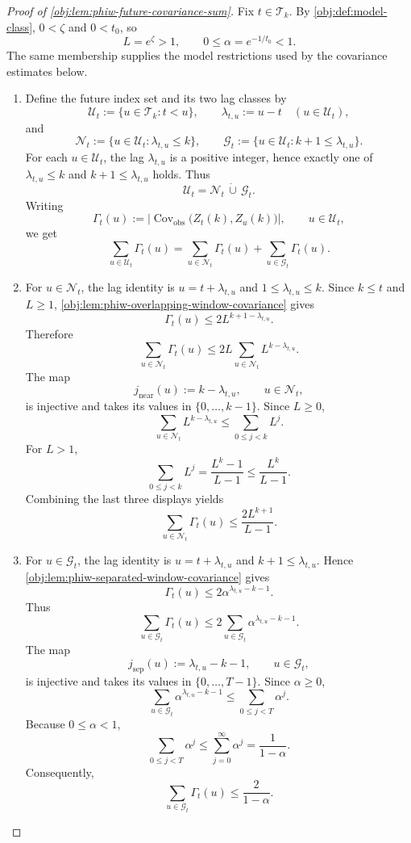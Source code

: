 \begin{proof}[Proof of \cref{obj:lem:phiw-future-covariance-sum}]
Fix \(t\in\mathscr T_k\). By \cref{obj:def:model-class}, \(0<\zeta\) and \(0<t_0\), so
\[
L=e^\zeta>1,
\qquad
0\le \alpha=e^{-1/t_0}<1 .
\]
The same membership supplies the model restrictions used by the covariance estimates below.

\begin{enumerate}
\item Define the future index set and its two lag classes by
\[
\mathscr U_t:=\{u\in\mathscr T_k:t<u\},
\qquad
\lambda_{t,u}:=u-t\quad (u\in\mathscr U_t),
\]
and
\[
\mathscr N_t:=\{u\in\mathscr U_t:\lambda_{t,u}\le k\},
\qquad
\mathscr G_t:=\{u\in\mathscr U_t:k+1\le \lambda_{t,u}\}.
\]
For each \(u\in\mathscr U_t\), the lag \(\lambda_{t,u}\) is a positive integer, hence exactly one of
\(\lambda_{t,u}\le k\) and \(k+1\le\lambda_{t,u}\) holds. Thus
\[
\mathscr U_t=\mathscr N_t\,\dot\cup\,\mathscr G_t .
\]
Writing
\[
\Gamma_t(u):=
\bigl|\operatorname{Cov}_{\mathrm{obs}}\bigl(Z_t(k),Z_u(k)\bigr)\bigr|,
\qquad u\in\mathscr U_t,
\]
we get
\[
\sum_{u\in\mathscr U_t}\Gamma_t(u)
=
\sum_{u\in\mathscr N_t}\Gamma_t(u)
+
\sum_{u\in\mathscr G_t}\Gamma_t(u).
\]

\item For \(u\in\mathscr N_t\), the lag identity is \(u=t+\lambda_{t,u}\) and
\(1\le\lambda_{t,u}\le k\). Since \(k\le t\) and \(L\ge1\), \cref{obj:lem:phiw-overlapping-window-covariance} gives
\[
\Gamma_t(u)\le 2L^{k+1-\lambda_{t,u}}.
\]
Therefore
\[
\sum_{u\in\mathscr N_t}\Gamma_t(u)
\le
2L\sum_{u\in\mathscr N_t}L^{k-\lambda_{t,u}}.
\]
The map
\[
j_{\mathrm{near}}(u):=k-\lambda_{t,u},
\qquad u\in\mathscr N_t,
\]
is injective and takes its values in \(\{0,\ldots,k-1\}\). Since \(L\ge0\),
\[
\sum_{u\in\mathscr N_t}L^{k-\lambda_{t,u}}
\le
\sum_{0\le j<k}L^j .
\]
For \(L>1\),
\[
\sum_{0\le j<k}L^j
=
\frac{L^k-1}{L-1}
\le
\frac{L^k}{L-1}.
\]
Combining the last three displays yields
\[
\sum_{u\in\mathscr N_t}\Gamma_t(u)
\le
\frac{2L^{k+1}}{L-1}.
\]

\item For \(u\in\mathscr G_t\), the lag identity is \(u=t+\lambda_{t,u}\) and
\(k+1\le\lambda_{t,u}\). Hence \cref{obj:lem:phiw-separated-window-covariance} gives
\[
\Gamma_t(u)
\le
2\alpha^{\lambda_{t,u}-k-1}.
\]
Thus
\[
\sum_{u\in\mathscr G_t}\Gamma_t(u)
\le
2\sum_{u\in\mathscr G_t}\alpha^{\lambda_{t,u}-k-1}.
\]
The map
\[
j_{\mathrm{sep}}(u):=\lambda_{t,u}-k-1,
\qquad u\in\mathscr G_t,
\]
is injective and takes its values in \(\{0,\ldots,T-1\}\). Since \(\alpha\ge0\),
\[
\sum_{u\in\mathscr G_t}\alpha^{\lambda_{t,u}-k-1}
\le
\sum_{0\le j<T}\alpha^j .
\]
Because \(0\le\alpha<1\),
\[
\sum_{0\le j<T}\alpha^j
\le
\sum_{j=0}^{\infty}\alpha^j
=
\frac{1}{1-\alpha}.
\]
Consequently,
\[
\sum_{u\in\mathscr G_t}\Gamma_t(u)
\le
\frac{2}{1-\alpha}.
\]


\end{enumerate}
\end{proof}
